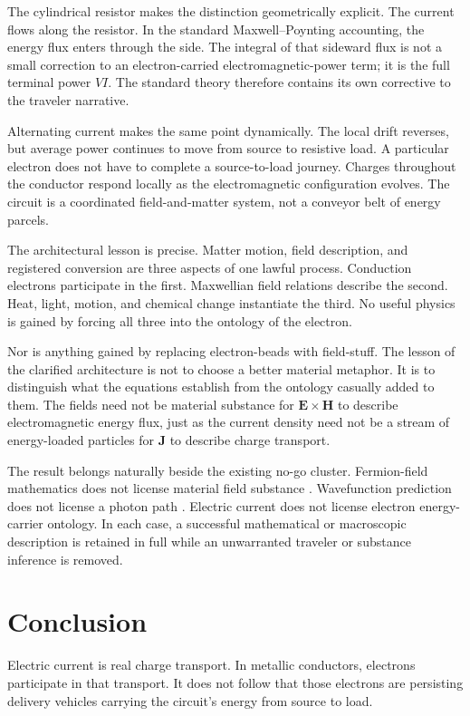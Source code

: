 \documentclass[12pt,onecolumn]{article}
\newcounter{nogo}[section]
\begin{document}
The cylindrical resistor makes the distinction geometrically explicit. The current flows along the resistor. In the standard Maxwell--Poynting accounting, the energy flux enters through the side. The integral of that sideward flux is not a small correction to an electron-carried electromagnetic-power term; it is the full terminal power $VI$. The standard theory therefore contains its own corrective to the traveler narrative.

Alternating current makes the same point dynamically. The local drift reverses, but average power continues to move from source to resistive load. A particular electron does not have to complete a source-to-load journey. Charges throughout the conductor respond locally as the electromagnetic configuration evolves. The circuit is a coordinated field-and-matter system, not a conveyor belt of energy parcels.

The architectural lesson is precise. Matter motion, field description, and registered conversion are three aspects of one lawful process. Conduction electrons participate in the first. Maxwellian field relations describe the second. Heat, light, motion, and chemical change instantiate the third. No useful physics is gained by forcing all three into the ontology of the electron.

Nor is anything gained by replacing electron-beads with field-stuff. The lesson of the clarified architecture is not to choose a better material metaphor. It is to distinguish what the equations establish from the ontology casually added to them. The fields need not be material substance for $\mathbf E\times\mathbf H$ to describe electromagnetic energy flux, just as the current density need not be a stream of energy-loaded particles for $\mathbf J$ to describe charge transport.

The result belongs naturally beside the existing no-go cluster. Fermion-field mathematics does not license material field substance \cite{fermion}. Wavefunction prediction does not license a photon path \cite{wavefunctionnogo}. Electric current does not license electron energy-carrier ontology. In each case, a successful mathematical or macroscopic description is retained in full while an unwarranted traveler or substance inference is removed.


\section{Conclusion}

Electric current is real charge transport. In metallic conductors, electrons participate in that transport. It does not follow that those electrons are persisting delivery vehicles carrying the circuit's energy from source to load.
\end{document}
